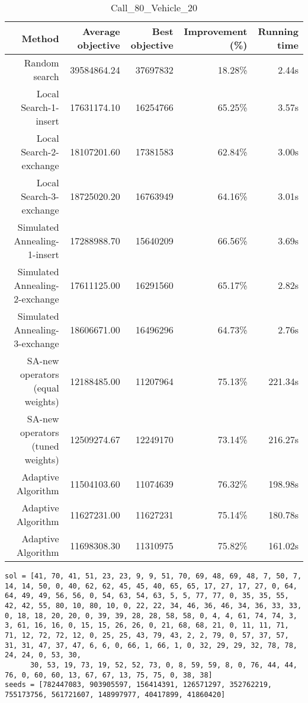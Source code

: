 \begin{table}[ht]
\centering
\caption{Call\_80\_Vehicle\_20}
\label{tab:call80vehicle20}
\begin{tabular}{|r|r|r|r|r|}
Method & Average objective & Best objective & Improvement (\%) & Running time \\
\hline
Random search & 39584864.24 & 37697832 & 18.28\% & 2.44s\\
Local Search-1-insert & 17631174.10 & 16254766 & 65.25\% & 3.57s\\
Local Search-2-exchange & 18107201.60 & 17381583 & 62.84\% & 3.00s\\
Local Search-3-exchange & 18725020.20 & 16763949 & 64.16\% & 3.01s\\
Simulated Annealing-1-insert & 17288988.70 & 15640209 & 66.56\% & 3.69s\\
Simulated Annealing-2-exchange & 17611125.00 & 16291560 & 65.17\% & 2.82s\\
Simulated Annealing-3-exchange & 18606671.00 & 16496296 & 64.73\% & 2.76s\\
SA-new operators (equal weights) & 12188485.00 & 11207964 & 75.13\% & 221.34s\\
SA-new operators (tuned weights) & 12509274.67 & 12249170 & 73.14\% & 216.27s\\
Adaptive Algorithm & 11504103.60 & 11074639 & 76.32\% & 198.98s\\
Adaptive Algorithm & 11627231.00 & 11627231 & 75.14\% & 180.78s\\
Adaptive Algorithm & 11698308.30 & 11310975 & 75.82\% & 161.02s\\
\end{tabular}%
\end{table}
\begin{lstlisting}[label={lst:call80vehicle20},caption=Optimal solution call\_80\_vehicle\_20]
sol = [41, 70, 41, 51, 23, 23, 9, 9, 51, 70, 69, 48, 69, 48, 7, 50, 7, 14, 14, 50, 0, 40, 62, 62, 45, 45, 40, 65, 65, 17, 27, 17, 27, 0, 64, 64, 49, 49, 56, 56, 0, 54, 63, 54, 63, 5, 5, 77, 77, 0, 35, 35, 55, 42, 42, 55, 80, 10, 80, 10, 0, 22, 22, 34, 46, 36, 46, 34, 36, 33, 33, 0, 18, 18, 20, 20, 0, 39, 39, 28, 28, 58, 58, 0, 4, 4, 61, 74, 74, 3, 3, 61, 16, 16, 0, 15, 15, 26, 26, 0, 21, 68, 68, 21, 0, 11, 11, 71, 71, 12, 72, 72, 12, 0, 25, 25, 43, 79, 43, 2, 2, 79, 0, 57, 37, 57, 31, 31, 47, 37, 47, 6, 6, 0, 66, 1, 66, 1, 0, 32, 29, 29, 32, 78, 78, 24, 24, 0, 53, 30,
      30, 53, 19, 73, 19, 52, 52, 73, 0, 8, 59, 59, 8, 0, 76, 44, 44, 76, 0, 60, 60, 13, 67, 67, 13, 75, 75, 0, 38, 38]
seeds = [782447083, 903905597, 156414391, 126571297, 352762219, 755173756, 561721607, 148997977, 40417899, 41860420]
\end{lstlisting}%
\clearpage


